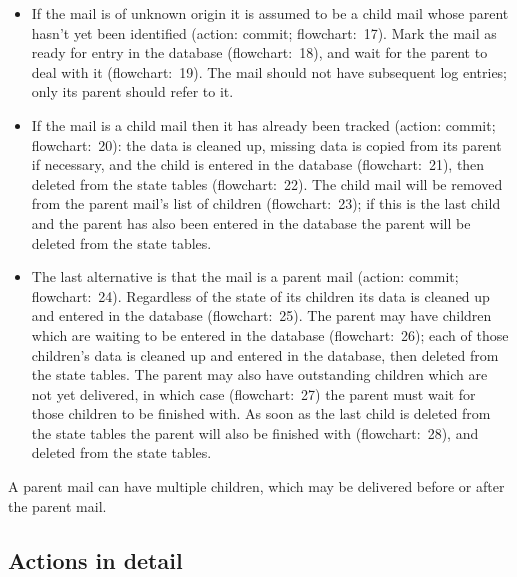 \documentclass[a4paper,12pt,draft]{article}
\begin{document}
\begin{itemize}

    \item If the mail is of unknown origin it is assumed to be a child mail
        whose parent hasn't yet been identified (action: commit;
        flowchart:~17).  Mark the mail as ready for entry in the database
        (flowchart:~18), and wait for the parent to deal with it
        (flowchart:~19).  The mail should not have subsequent log entries;
        only its parent should refer to it.

    \item If the mail is a child mail then it has already been tracked
        (action: commit; flowchart:~20): the data is cleaned up, missing
        data is copied from its parent if necessary, and the child is
        entered in the database (flowchart:~21), then deleted from the
        state tables (flowchart:~22).  The child mail will be removed from
        the parent mail's list of children (flowchart:~23); if this is the
        last child and the parent has also been entered in the database the
        parent will be deleted from the state tables.

    \item The last alternative is that the mail is a parent mail (action:
        commit; flowchart:~24).  Regardless of the state of its children
        its data is cleaned up and entered in the database (flowchart:~25).
        The parent may have children which are waiting to be entered in the
        database (flowchart:~26); each of those children's data is cleaned
        up and entered in the database, then deleted from the state tables.
        The parent may also have outstanding children which are not yet
        delivered, in which case (flowchart:~27) the parent must wait for
        those children to be finished with.  As soon as the last child is
        deleted from the state tables the parent will also be finished with
        (flowchart:~28), and deleted from the state tables.

\end{itemize}

A parent mail can have multiple children, which may be delivered before or
after the parent mail.  

\subsection{Actions in detail}

\label{actions-in-detail}
\end{document}
